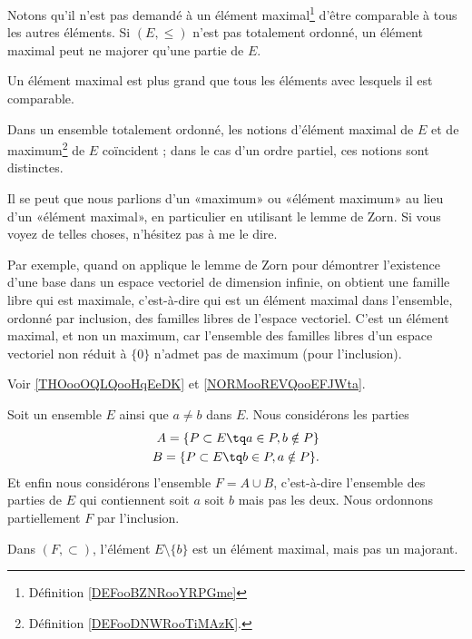 \begin{normaltext}    \label{NORMooVHIBooJAOsou}
	Notons qu'il n'est pas demandé à un élément maximal\footnote{Définition \ref{DEFooBZNRooYRPGme}} d'être comparable à tous les autres éléments. Si \( (E,\leq)\) n'est pas totalement ordonné, un élément maximal peut ne majorer qu'une partie de \( E\).

	Un élément maximal est plus grand que tous les éléments avec lesquels il est comparable.

	Dans un ensemble totalement ordonné, les notions d'élément maximal de \( E\) et de maximum\footnote{Définition \ref{DEFooDNWRooTiMAzK}.} de \( E\) coïncident ; dans le cas d'un ordre partiel, ces notions sont distinctes.

	Il se peut que nous parlions d'un «maximum» ou «élément maximum»  au lieu d'un «élément maximal», en particulier en utilisant le lemme de Zorn. Si vous voyez de telles choses, n'hésitez pas à me le dire.

	Par exemple, quand on applique le lemme de Zorn pour démontrer l'existence d'une base dans un espace vectoriel de dimension infinie, on obtient une famille libre qui est maximale, c'est-à-dire qui est un élément maximal dans l'ensemble, ordonné par inclusion, des familles libres de l'espace vectoriel. C'est un élément maximal, et non un maximum, car l'ensemble des familles libres d'un espace vectoriel non réduit à \( \{ 0 \}\) n'admet pas de maximum (pour l'inclusion).

	Voir \ref{THOooOQLQooHqEeDK} et \ref{NORMooREVQooEFJWta}.		%
\end{normaltext}

\begin{example} \label{ExeooMaximalPasMajorant}
	Soit un ensemble \( E\) ainsi que \( a\neq b\) dans \( E\). Nous considérons les parties
	\begin{subequations}
		\begin{align}
			A=\{ P\subset E\tq a\in P,b\notin P \} \\
			B=\{ P\subset E\tq b\in P,a\notin P \}.
		\end{align}
	\end{subequations}
	Et enfin nous considérons l'ensemble \( F=A\cup B\), c'est-à-dire l'ensemble des parties de \( E\) qui contiennent soit \( a\) soit \( b\) mais pas les deux. Nous ordonnons partiellement \( F\) par l'inclusion.

	Dans \( (F,\subset)\), l'élément \( E\setminus\{ b \}\) est un élément maximal, mais pas un majorant.
\end{example}

